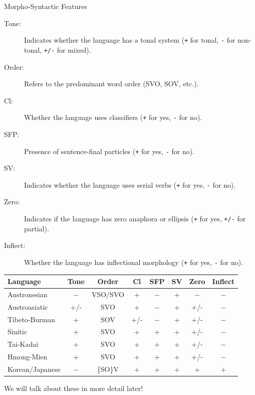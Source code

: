 \documentclass{beamer}
\begin{document}
\begin{frame}[allowframebreaks]{Morpho-Syntactic Features}
\begin{description}
    \item[Tone:] Indicates whether the language has a tonal system (\texttt{+} for tonal, \texttt{-} for non-tonal, \texttt{+/-} for mixed).
    \item[Order:] Refers to the predominant word order (SVO, SOV, etc.).
    \item[Cl:] Whether the language uses classifiers (\texttt{+} for yes, \texttt{-} for no).
    \item[SFP:] Presence of sentence-final particles (\texttt{+} for yes, \texttt{-} for no).
    \item[SV:] Indicates whether the language uses serial verbs (\texttt{+} for yes, \texttt{-} for no).
    \item[Zero:] Indicates if the language has zero anaphora or ellipsis (\texttt{+} for yes, \texttt{+/-} for partial).
    \item[Inflect:] Whether the language has inflectional morphology (\texttt{+} for yes, \texttt{-} for no).
    \end{description}

    \framebreak

\begin{center}
\begin{tabular}{lccccccc}

 \textbf{Language}        & \textbf{Tone} & \textbf{Order} & \textbf{Cl} & \textbf{SFP} & \textbf{SV} & \textbf{Zero} & \textbf{Inflect} \\ \hline
Austronesian    & $-$ & VSO/SVO & + & $-$ & + & $-$ & $-$ \\ 
Austroasiatic   & +/- & SVO & + & $-$ & + & +/- & $-$ \\ 
Tibeto-Burman   & + & SOV & +/- & $-$ & + & +/- & $-$ \\ 
Sinitic         & +  & SVO & +  & + & + & +/- & $-$ \\ 
Tai-Kadai       & +  & SVO & + & + & + & +/- & $-$ \\ 
Hmong-Mien      & +  & SVO & + & + & + & +/- & $-$ \\ 
Korean/Japanese & $-$  & \{SO\}V & + & + & + & + & + \\ 

  \end{tabular}
      \end{center}
We will talk about these in more detail later!
      
\end{frame}
\end{document}
